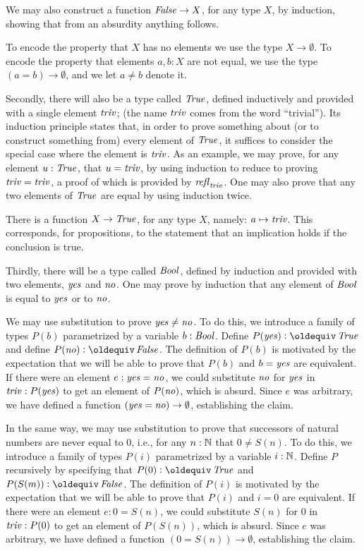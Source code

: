 We may also construct a function $\mathop{\mathit{False}} \to X$, for any type $X$, by induction, showing that from an absurdity anything follows.

To encode the property that $X$ has no elements we use the type $X \to \emptyset$.  To encode the property that elements $a,b:X$ are not equal,
we use the type $(a=b) \to \emptyset$, and we let $a \ne b$ denote it.

Secondly, there will also be a type called $\mathop{\mathit{True}}$, defined inductively and provided with a single element $\mathop{\mathit{triv}}$; (the name $\mathop{\mathit{triv}}$ comes from the word
  ``trivial'').  Its induction principle
states that, in order to prove something about (or to construct something from) every element of $\mathop{\mathit{True}}$, it suffices to consider the special
case where the element is $\mathop{\mathit{triv}}$.  As an example, we may prove, for any element $u : \mathop{\mathit{True}}$, that $u=\mathop{\mathit{triv}}$, by using induction to reduce
to proving $\mathop{\mathit{triv}}=\mathop{\mathit{triv}}$, a proof of which is provided by $\mathop{{\it refl}_{\mathop{\mathit{triv}}}}$.  One may also prove that any two elements of $\mathop{\mathit{True}}$ are equal by using induction twice.

There is a function $X \to \mathop{\mathit{True}}$, for any type $X$, namely: $a \mapsto \mathop{\mathit{triv}}$.  This corresponds, for propositions, to the statement that an
implication holds if the conclusion is true.

Thirdly, there will be a type called $\mathop{\mathit{Bool}}$, defined by induction and provided with two elements, $\mathop{\mathit{yes}}$ and $\mathop{\mathit{no}}$.  One may prove by induction
that any element of $\mathop{\mathit{Bool}}$ is equal to $\mathop{\mathit{yes}}$ or to $\mathop{\mathit{no}}$.

We may use substitution to prove $\mathop{\mathit{yes}} \ne \mathop{\mathit{no}}$.  To do this, we introduce a family of types $P(b)$ parametrized by a variable $b:\mathop{\mathit{Bool}}$.
Define $P(\yes) \defeq \true$ and define $P(\no) \defeq \false$.  The definition of $P(b)$ is motivated by the expectation that we will be able
to prove that $P(b)$ and $b = \mathop{\mathit{yes}}$ are equivalent.  If there were an element $e: \mathop{\mathit{yes}} = \mathop{\mathit{no}}$, we could substitute $\mathop{\mathit{no}}$ for $\mathop{\mathit{yes}}$ in $\mathop{\mathit{triv}} :
P (\mathop{\mathit{yes}})$ to get an element of $P(\mathop{\mathit{no}})$, which is absurd.  Since $e$ was arbitrary, we have defined a function $(\mathop{\mathit{yes}}=\mathop{\mathit{no}}) \to \emptyset$,
establishing the claim.

In the same way, we may use substitution to prove that successors of natural numbers are never equal to $0$, i.e., for any $n:\mathbb{N}$ that $0 \ne
S(n)$.  To do this, we introduce a family of types $P(i)$ parametrized by a variable $i:\mathbb{N}$.  Define $P$ recursively by specifying that $P(0)
\defeq \true$ and $P(S(m)) \defeq \false$.  The definition of $P(i)$ is motivated by the expectation that we will be able to prove that $P(i)$
and $i = 0$ are equivalent.  If there were an element $e: 0 = S(n)$, we could substitute $S(n)$ for $0$ in $\mathop{\mathit{triv}} : P ( 0 )$ to get an element
of $P(S(n))$, which is absurd.  Since $e$ was arbitrary, we have defined a function $(0=S(n)) \to \emptyset$, establishing the claim.

